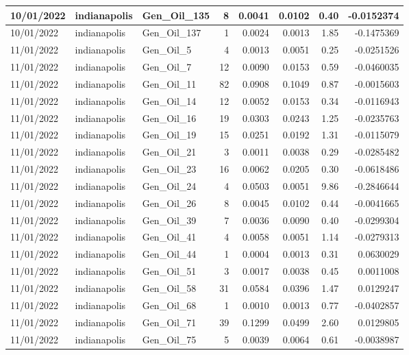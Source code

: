 \documentclass[
  letterpaper,
  DIV=11,
  numbers=noendperiod]{scrartcl}
\begin{document}
\begin{tabular}{l|l|l|r|r|r|r|r}
\hline
10/01/2022 & indianapolis & Gen\_Oil\_135 & 8 & 0.0041 & 0.0102 & 0.40 & -0.0152374\\
\hline
10/01/2022 & indianapolis & Gen\_Oil\_137 & 1 & 0.0024 & 0.0013 & 1.85 & -0.1475369\\
\hline
11/01/2022 & indianapolis & Gen\_Oil\_5 & 4 & 0.0013 & 0.0051 & 0.25 & -0.0251526\\
\hline
11/01/2022 & indianapolis & Gen\_Oil\_7 & 12 & 0.0090 & 0.0153 & 0.59 & -0.0460035\\
\hline
11/01/2022 & indianapolis & Gen\_Oil\_11 & 82 & 0.0908 & 0.1049 & 0.87 & -0.0015603\\
\hline
11/01/2022 & indianapolis & Gen\_Oil\_14 & 12 & 0.0052 & 0.0153 & 0.34 & -0.0116943\\
\hline
11/01/2022 & indianapolis & Gen\_Oil\_16 & 19 & 0.0303 & 0.0243 & 1.25 & -0.0235763\\
\hline
11/01/2022 & indianapolis & Gen\_Oil\_19 & 15 & 0.0251 & 0.0192 & 1.31 & -0.0115079\\
\hline
11/01/2022 & indianapolis & Gen\_Oil\_21 & 3 & 0.0011 & 0.0038 & 0.29 & -0.0285482\\
\hline
11/01/2022 & indianapolis & Gen\_Oil\_23 & 16 & 0.0062 & 0.0205 & 0.30 & -0.0618486\\
\hline
11/01/2022 & indianapolis & Gen\_Oil\_24 & 4 & 0.0503 & 0.0051 & 9.86 & -0.2846644\\
\hline
11/01/2022 & indianapolis & Gen\_Oil\_26 & 8 & 0.0045 & 0.0102 & 0.44 & -0.0041665\\
\hline
11/01/2022 & indianapolis & Gen\_Oil\_39 & 7 & 0.0036 & 0.0090 & 0.40 & -0.0299304\\
\hline
11/01/2022 & indianapolis & Gen\_Oil\_41 & 4 & 0.0058 & 0.0051 & 1.14 & -0.0279313\\
\hline
11/01/2022 & indianapolis & Gen\_Oil\_44 & 1 & 0.0004 & 0.0013 & 0.31 & 0.0630029\\
\hline
11/01/2022 & indianapolis & Gen\_Oil\_51 & 3 & 0.0017 & 0.0038 & 0.45 & 0.0011008\\
\hline
11/01/2022 & indianapolis & Gen\_Oil\_58 & 31 & 0.0584 & 0.0396 & 1.47 & 0.0129247\\
\hline
11/01/2022 & indianapolis & Gen\_Oil\_68 & 1 & 0.0010 & 0.0013 & 0.77 & -0.0402857\\
\hline
11/01/2022 & indianapolis & Gen\_Oil\_71 & 39 & 0.1299 & 0.0499 & 2.60 & 0.0129805\\
\hline
11/01/2022 & indianapolis & Gen\_Oil\_75 & 5 & 0.0039 & 0.0064 & 0.61 & -0.0038987\\

\end{tabular}
\end{document}
